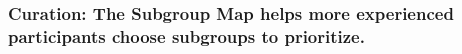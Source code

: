 

\subsubsection{Curation: The Subgroup Map helps more experienced participants choose subgroups to prioritize.}
\label{sec:results-curation}

